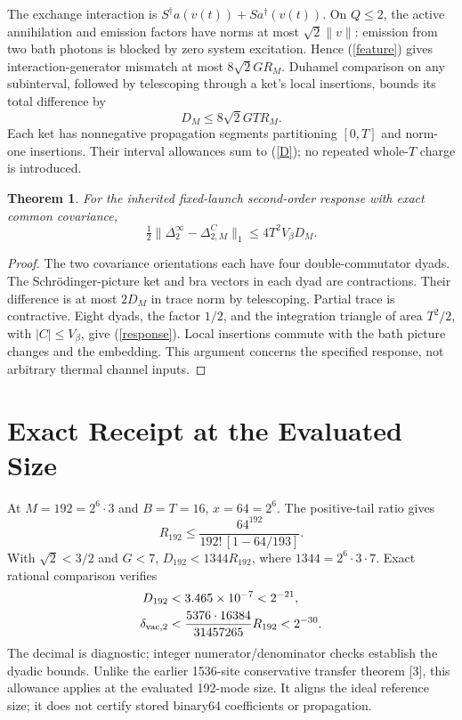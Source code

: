 \documentclass[a4paper,journal]{IEEEtran}
\newtheorem{theorem}{Theorem}
\begin{document}
The exchange interaction is $S^\dagger a(v(t))+S a^\dagger(v(t))$. On $Q\le2$, the active annihilation and emission factors have norms at most $\sqrt2\|v\|$: emission from two bath photons is blocked by zero system excitation. Hence (\ref{feature}) gives interaction-generator mismatch at most $8\sqrt2G R_M$. Duhamel comparison on any subinterval, followed by telescoping through a ket's local insertions, bounds its total difference by
\begin{equation}\label{D}
 D_M\le8\sqrt2G T R_M.
\end{equation}
Each ket has nonnegative propagation segments partitioning $[0,T]$ and norm-one insertions. Their interval allowances sum to (\ref{D}); no repeated whole-$T$ charge is introduced.

\begin{theorem}
For the inherited fixed-launch second-order response with exact common covariance,
\begin{equation}\label{response}
 \tfrac12\|\Delta_2^\infty-\Delta_{2,M}^{C}\|_1
 \le4T^2V_\beta D_M.
\end{equation}
\end{theorem}
\begin{proof}
The two covariance orientations each have four double-commutator dyads. The Schr\"odinger-picture ket and bra vectors in each dyad are contractions. Their difference is at most $2D_M$ in trace norm by telescoping. Partial trace is contractive. Eight dyads, the factor $1/2$, and the integration triangle of area $T^2/2$, with $|C|\le V_\beta$, give (\ref{response}). Local insertions commute with the bath picture changes and the embedding. This argument concerns the specified response, not arbitrary thermal channel inputs.
\end{proof}
\section{Exact Receipt at the Evaluated Size}
At $M=192=2^6\cdot3$ and $B=T=16$, $x=64=2^6$. The positive-tail ratio gives
\begin{equation}
 R_{192}\le\frac{64^{192}}{192!\,[1-64/193]}.
\end{equation}
With $\sqrt2<3/2$ and $G<7$, $D_{192}<1344R_{192}$, where $1344=2^6\cdot3\cdot7$. Exact rational comparison verifies
\begin{align}
 D_{192}&<3.465\times10^{-7}<2^{-21},\\
 \delta_{\rm vac,2}&<\frac{5376\cdot16384}{31457265}R_{192}
 <2^{-30}.
\end{align}
The decimal is diagnostic; integer numerator/denominator checks establish the dyadic bounds. Unlike the earlier 1536-site conservative transfer theorem [3], this allowance applies at the evaluated 192-mode size. It aligns the ideal reference size; it does not certify stored binary64 coefficients or propagation.
\end{document}
